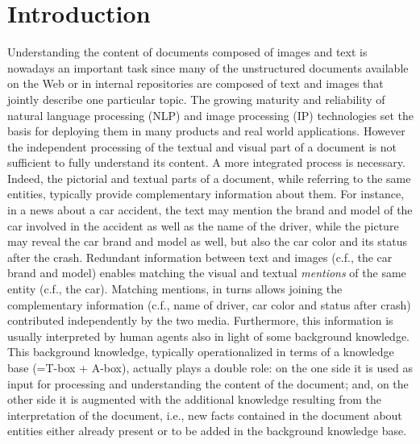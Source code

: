 \documentclass[11pt,a4paper]{article}
\begin{document}
\section{Introduction}
\label{sec:intro}
Understanding the content of documents composed of images and text is nowadays an important task since many of the unstructured documents
available on the Web or in internal repositories are composed of text and images that jointly describe one particular topic.
%
The growing maturity and reliability of natural language processing (NLP) and image processing (IP) technologies set the basis for deploying them in many products and real world applications.
%
However the independent processing of the textual and visual part of a document is not sufficient to fully understand its content. A more
integrated process is necessary. 
%
Indeed, the pictorial and textual parts of a document, while referring to the same entities, typically provide complementary information
about them.  For instance, in a news about a car accident, the text may mention the brand and model of the car involved in the accident as well as the name of the driver, while the picture may reveal the car brand and model as well, but also the car color and its status after the crash.  Redundant information between text and images (c.f., the car brand and model) enables matching the visual and textual
\emph{mentions} of the same entity (c.f., the car). Matching mentions, in turns allows joining the complementary information (c.f., name of driver, car color and status after crash) contributed independently by the two media.
%
Furthermore, this information is usually interpreted by human agents also in light of some background knowledge. This background knowledge, typically operationalized in terms of a knowledge base (=T-box + A-box), actually plays a double role:  on the one side it is 
used as input for processing and understanding the content of the document; and, on the other side it is augmented with the additional knowledge resulting from the interpretation of the document, i.e., new facts contained in the document about entities either already present or to be added in the background knowledge base.
\end{document}
